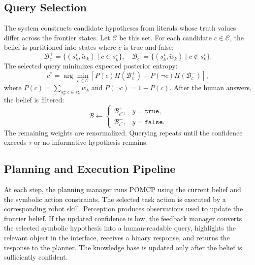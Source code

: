 \subsection{Query Selection}

The system constructs candidate hypotheses from literals whose truth values differ across the frontier states. Let $\mathcal{C}$ be this set. For each candidate $c\in \mathcal{C}$, the belief is partitioned into states where $c$ is true and false:
\[
\mathcal{B}^{+}_{c}=\{(s_k^\star,\tilde{w}_k)\mid c\in s_k^\star\}, \quad
\mathcal{B}^{-}_{c}=\{(s_k^\star,\tilde{w}_k)\mid c\notin s_k^\star\}.
\]
The selected query minimizes expected posterior entropy:
\begin{equation}
c^*=\arg\min_{c\in \mathcal{C}}
\left[
P(c)H(\mathcal{B}^{+}_{c})+
P(\neg c)H(\mathcal{B}^{-}_{c})
\right],
\label{eq:query_selection}
\end{equation}
where $P(c)=\sum_{s_k^\star:c\in s_k^\star}\tilde{w}_k$ and $P(\neg c)=1-P(c)$. After the human answers, the belief is filtered:
\begin{equation}
\mathcal{B}\leftarrow
\begin{cases}
\mathcal{B}^{+}_{c^*}, & y=\texttt{true},\\
\mathcal{B}^{-}_{c^*}, & y=\texttt{false}.
\end{cases}
\label{eq:filter}
\end{equation}
The remaining weights are renormalized. Querying repeats until the confidence exceeds $\tau$ or no informative hypothesis remains.

\subsection{Planning and Execution Pipeline}


At each step, the planning manager runs POMCP using the current belief and the symbolic action constraints. The selected task action is executed by a corresponding robot skill. Perception produces observations used to update the frontier belief. If the updated confidence is low, the feedback manager converts the selected symbolic hypothesis into a human-readable query, highlights the relevant object in the interface, receives a binary response, and returns the response to the planner. The knowledge base is updated only after the belief is sufficiently confident.

